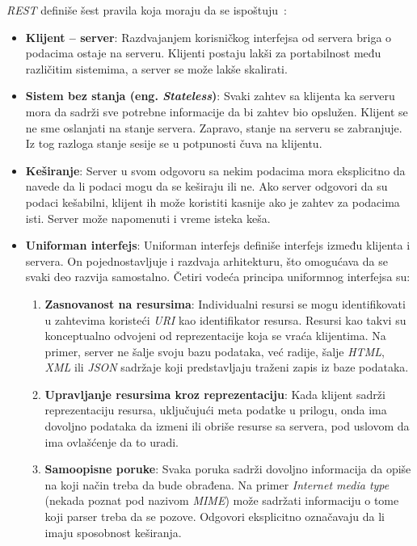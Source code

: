 \textit{REST} definiše šest pravila koja moraju da se ispoštuju~\cite{REST_API}:

\begin{itemize}

	\item \textbf{Klijent -- server}: Razdvajanjem korisničkog interfejsa od servera briga o podacima 
	ostaje na serveru. Klijenti postaju lakši za portabilnost među različitim sistemima, a server se može
    lakše skalirati.
	
    \item \textbf{Sistem bez stanja (eng. \textit{Stateless})}: Svaki zahtev sa klijenta ka serveru mora da sadrži 
	sve potrebne informacije da bi zahtev bio opslužen. Klijent se ne sme oslanjati na stanje servera. 
    Zapravo, stanje na serveru se zabranjuje. Iz tog razloga stanje sesije se u potpunosti čuva na klijentu.
	
    \item \textbf{Keširanje}: Server u svom odgovoru sa nekim podacima mora eksplicitno da navede da li 
    podaci mogu da se keširaju ili ne. Ako server odgovori da su podaci kešabilni, klijent ih može 
    koristiti kasnije ako je zahtev za podacima isti. Server može napomenuti i vreme isteka keša.
    
    \item \textbf{Uniforman interfejs}: Uniforman interfejs definiše interfejs između klijenta i servera.
    On pojednostavljuje i razdvaja arhitekturu, što omogućava da se svaki deo razvija samostalno. 
    Četiri vodeća principa uniformnog interfejsa su:

    \begin{enumerate}
        \item \textbf{Zasnovanost na resursima}: Individualni resursi se mogu identifikovati u 
        zahtevima koristeći \textit{URI} kao identifikator resursa. Resursi kao takvi su konceptualno odvojeni 
        od reprezentacije koja se vraća klijentima. Na primer, server ne šalje svoju bazu podataka, 
        već radije, šalje \textit{HTML}, \textit{XML} ili \textit{JSON} sadržaje koji predstavljaju traženi zapis iz baze podataka.

        \item \textbf{Upravljanje resursima kroz reprezentaciju}: Kada klijent sadrži reprezentaciju resursa,
        uključujući meta podatke u prilogu, onda ima dovoljno podataka da izmeni ili obriše resurse 
        sa servera, pod uslovom da ima ovlašćenje da to uradi.

        \item \textbf{Samoopisne poruke}: Svaka poruka sadrži dovoljno informacija da opiše na koji 
        način treba da bude obrađena. Na primer \textit{Internet media type} (nekada poznat pod nazivom \textit{MIME}) 
        može sadržati informaciju o tome koji parser treba da se pozove. Odgovori eksplicitno 
        označavaju da li imaju sposobnost keširanja.


\end{enumerate}
\end{itemize}
